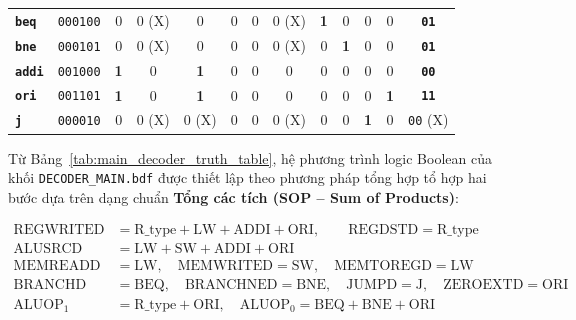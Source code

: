 \documentclass[12pt,a4paper]{report}
\begin{document}
\begin{table}[H]
{{\begin{tabular}{@{}lcccccccccccc@{}}
\textbf{\texttt{beq}}  & \texttt{000100} & 0          & 0 (X)      & 0          & 0          & 0          & 0 (X)      & \textbf{1} & 0          & 0          & 0          & \textbf{\texttt{01}} \\
\textbf{\texttt{bne}}  & \texttt{000101} & 0          & 0 (X)      & 0          & 0          & 0          & 0 (X)      & 0          & \textbf{1} & 0          & 0          & \textbf{\texttt{01}} \\
\textbf{\texttt{addi}} & \texttt{001000} & \textbf{1} & 0          & \textbf{1} & 0          & 0          & 0          & 0          & 0          & 0          & 0          & \textbf{\texttt{00}} \\
\textbf{\texttt{ori}}  & \texttt{001101} & \textbf{1} & 0          & \textbf{1} & 0          & 0          & 0          & 0          & 0          & 0          & \textbf{1} & \textbf{\texttt{11}} \\
\textbf{\texttt{j}}    & \texttt{000010} & 0          & 0 (X)      & 0 (X)      & 0          & 0          & 0 (X)      & 0          & 0          & \textbf{1} & 0          & \texttt{00} (X)      \\ \bottomrule
\end{tabular}%
}%
}
\end{table}
Từ Bảng~\ref{tab:main_decoder_truth_table}, hệ phương trình logic Boolean của khối \texttt{DECODER\_MAIN.bdf} được thiết lập theo phương pháp tổng hợp tổ hợp hai bước dựa trên dạng chuẩn \textbf{Tổng các tích (SOP -- Sum of Products)}:

\begin{align}
    \text{REGWRITED} &= \text{R\_type} + \text{LW} + \text{ADDI} + \text{ORI}, \qquad \text{REGDSTD} = \text{R\_type} \\
    \text{ALUSRCD}   &= \text{LW} + \text{SW} + \text{ADDI} + \text{ORI} \\
    \text{MEMREADD}  &= \text{LW}, \quad \text{MEMWRITED} = \text{SW}, \quad \text{MEMTOREGD} = \text{LW} \\
    \text{BRANCHD}   &= \text{BEQ}, \quad \text{BRANCHNED} = \text{BNE}, \quad \text{JUMPD} = \text{J}, \quad \text{ZEROEXTD} = \text{ORI} \\
    \text{ALUOP}_1   &= \text{R\_type} + \text{ORI}, \quad \text{ALUOP}_0 = \text{BEQ} + \text{BNE} + \text{ORI}
\end{align}
\end{document}
